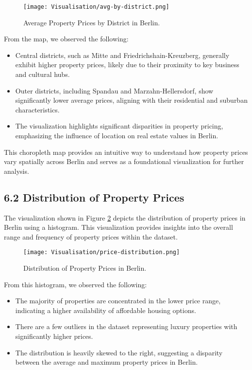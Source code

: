 \documentclass[twocolumn]{article}
\begin{document}
\begin{figure}[H]
    \centering
    \texttt{[image: Visualisation/avg-by-district.png]} 
    \caption{Average Property Prices by District in Berlin.}
    \label{fig:berlin_prices}
\end{figure}

From the map, we observed the following:
\begin{itemize}
    \item Central districts, such as Mitte and Friedrichshain-Kreuzberg, generally exhibit higher property prices, likely due to their proximity to key business and cultural hubs.
    \item Outer districts, including Spandau and Marzahn-Hellersdorf, show significantly lower average prices, aligning with their residential and suburban characteristics.
    \item The visualization highlights significant disparities in property pricing, emphasizing the influence of location on real estate values in Berlin.
\end{itemize}

This choropleth map provides an intuitive way to understand how property prices vary spatially across Berlin and serves as a foundational visualization for further analysis.

\subsection*{6.2 Distribution of Property Prices}
The visualization shown in Figure \ref{fig:price_distribution} depicts the distribution of property prices in Berlin using a histogram. This visualization provides insights into the overall range and frequency of property prices within the dataset.

\begin{figure}[H]
    \centering
    \texttt{[image: Visualisation/price-distribution.png]} 
    \caption{Distribution of Property Prices in Berlin.}
    \label{fig:price_distribution}
\end{figure}

From this histogram, we observed the following:
\begin{itemize}
    \item The majority of properties are concentrated in the lower price range, indicating a higher availability of affordable housing options.
    \item There are a few outliers in the dataset representing luxury properties with significantly higher prices.
    \item The distribution is heavily skewed to the right, suggesting a disparity between the average and maximum property prices in Berlin.
\end{itemize}
\end{document}
